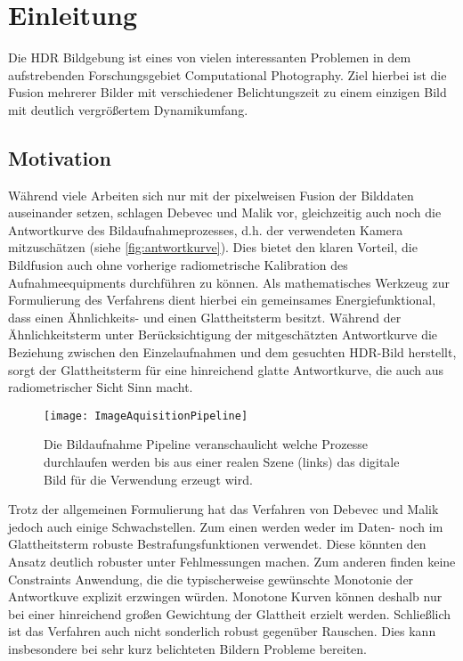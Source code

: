\chapter{Einleitung}
Die \gls{HDR} Bildgebung ist eines von vielen interessanten Problemen in dem aufstrebenden Forschungsgebiet Computational Photography. Ziel hierbei ist die Fusion mehrerer Bilder mit verschiedener Belichtungszeit zu einem einzigen Bild mit deutlich vergrößertem Dynamikumfang.
 
\section{Motivation}


Während viele Arbeiten sich nur mit der pixelweisen Fusion der Bilddaten auseinander setzen, schlagen Debevec und Malik \cite{paper} vor, gleichzeitig auch noch die Antwortkurve des Bildaufnahmeprozesses, d.h. der verwendeten Kamera mitzuschätzen (siehe \autoref{fig:antwortkurve}). Dies bietet den klaren Vorteil, die Bildfusion auch ohne vorherige radiometrische Kalibration des Aufnahmeequipments durchführen zu können. Als mathematisches Werkzeug zur Formulierung des Verfahrens dient hierbei ein gemeinsames Energiefunktional, dass einen Ähnlichkeits- und einen  Glattheitsterm besitzt. Während der Ähnlichkeitsterm unter Berücksichtigung der mitgeschätzten Antwortkurve die Beziehung zwischen den Einzelaufnahmen und dem gesuchten HDR-Bild herstellt, sorgt der Glattheitsterm für eine hinreichend glatte Antwortkurve, die auch aus radiometrischer Sicht Sinn macht.


\begin{figure}
  \begin{center}
    \texttt{[image: ImageAquisitionPipeline]}
    \caption{Die Bildaufnahme Pipeline veranschaulicht welche Prozesse durchlaufen werden bis aus einer realen Szene (links) das digitale Bild für die Verwendung erzeugt wird. \cite[S.2]{paper}}
    \label{fig:antwortkurve}
  \end{center}
\end{figure}


Trotz der allgemeinen Formulierung hat das Verfahren von Debevec und Malik jedoch auch einige Schwachstellen. Zum einen werden weder im Daten- noch im Glattheitsterm robuste Bestrafungsfunktionen verwendet. Diese könnten den Ansatz deutlich robuster unter Fehlmessungen machen. Zum anderen finden keine Constraints Anwendung, die die typischerweise gewünschte Monotonie der Antwortkuve explizit erzwingen würden. Monotone Kurven können deshalb nur bei einer hinreichend großen Gewichtung der Glattheit erzielt werden. Schließlich ist das Verfahren auch nicht sonderlich robust gegenüber Rauschen. Dies kann insbesondere bei sehr kurz belichteten Bildern Probleme bereiten. 

